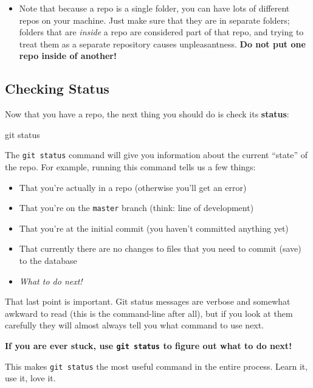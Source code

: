 \documentclass[]{book}
\newenvironment{Shaded}{\begin{snugshade}}{\end{snugshade}}
\newcommand{\FunctionTok}[1]{\textcolor[rgb]{0.00,0.00,0.00}{#1}}
\newcommand{\NormalTok}[1]{#1}
\providecommand{\tightlist}{%
  \setlength{\itemsep}{0pt}\setlength{\parskip}{0pt}}
\theoremstyle{definition}
\theoremstyle{definition}
\theoremstyle{remark}
\begin{document}
\begin{itemize}
\tightlist
\item
  Note that because a repo is a single folder, you can have lots of
  different repos on your machine. Just make sure that they are in
  separate folders; folders that are \emph{inside} a repo are considered
  part of that repo, and trying to treat them as a separate repository
  causes unpleasantness. \textbf{Do not put one repo inside of another!}
\end{itemize}

\subsection{Checking Status}\label{checking-status}

Now that you have a repo, the next thing you should do is check its
\textbf{status}:

\begin{Shaded}
\begin{Highlighting}[]
\FunctionTok{git}\NormalTok{ status}
\end{Highlighting}
\end{Shaded}

The \texttt{git\ status} command will give you information about the
current ``state'' of the repo. For example, running this command tells
us a few things:

\begin{itemize}
\tightlist
\item
  That you're actually in a repo (otherwise you'll get an error)
\item
  That you're on the \texttt{master} branch (think: line of development)
\item
  That you're at the initial commit (you haven't committed anything yet)
\item
  That currently there are no changes to files that you need to commit
  (save) to the database
\item
  \emph{What to do next!}
\end{itemize}

That last point is important. Git status messages are verbose and
somewhat awkward to read (this is the command-line after all), but if
you look at them carefully they will almost always tell you what command
to use next.

\textbf{If you are ever stuck, use \texttt{git\ status} to figure out
what to do next!}

This makes \texttt{git\ status} the most useful command in the entire
process. Learn it, use it, love it.
\end{document}
